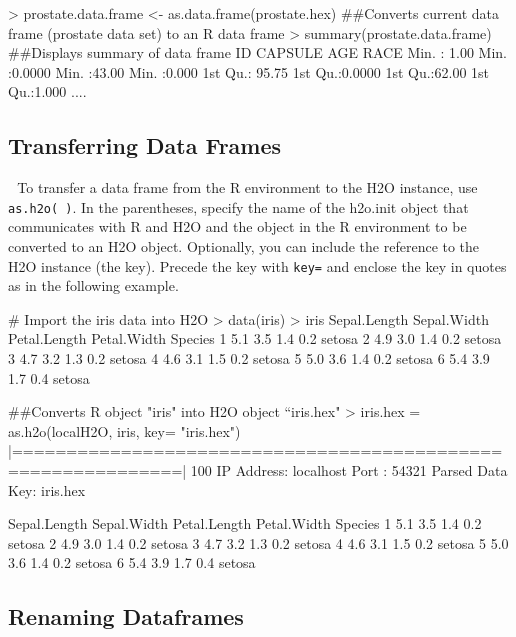 \documentclass[11pt]{article}
\begin{document}
{\begin{spverbatim}
 > prostate.data.frame <- as.data.frame(prostate.hex)
##Converts current data frame (prostate data set) to an R data frame
 > summary(prostate.data.frame) ##Displays summary of data frame
       ID            CAPSULE            AGE             RACE
Min.   :  1.00   Min.   :0.0000   Min.   :43.00   Min.   :0.000
1st Qu.: 95.75   1st Qu.:0.0000   1st Qu.:62.00   1st Qu.:1.000
       .... 
\end{spverbatim}


\subsection{Transferring Data Frames} 
To transfer a data frame from the R environment to the H2O instance, use  {\texttt{as.h2o( )}}. In the parentheses, specify the name of the h2o.init object that communicates with R and H2O and the object in the R environment to be converted to an H2O object. Optionally, you can include the reference to the H2O instance (the key). Precede the key with {\texttt{key=}} and enclose the key in quotes as in the following example. 

\begin{spverbatim}
# Import the iris data into H2O
> data(iris)
> iris
    Sepal.Length Sepal.Width Petal.Length Petal.Width    Species
1            5.1         3.5          1.4         0.2     setosa
2            4.9         3.0          1.4         0.2     setosa
3            4.7         3.2          1.3         0.2     setosa
4            4.6         3.1          1.5         0.2     setosa
5            5.0         3.6          1.4         0.2     setosa
6            5.4         3.9          1.7         0.4     setosa

##Converts R object "iris" into H2O object “iris.hex"
> iris.hex = as.h2o(localH2O, iris, key= "iris.hex")
  |=============================================================| 100%
IP Address: localhost 
Port      : 54321 
Parsed Data Key: iris.hex 

  Sepal.Length Sepal.Width Petal.Length Petal.Width Species
1          5.1         3.5          1.4         0.2  setosa
2          4.9         3.0          1.4         0.2  setosa
3          4.7         3.2          1.3         0.2  setosa
4          4.6         3.1          1.5         0.2  setosa
5          5.0         3.6          1.4         0.2  setosa
6          5.4         3.9          1.7         0.4  setosa
\end{spverbatim}


\subsection{Renaming Dataframes}

}
\end{document}
